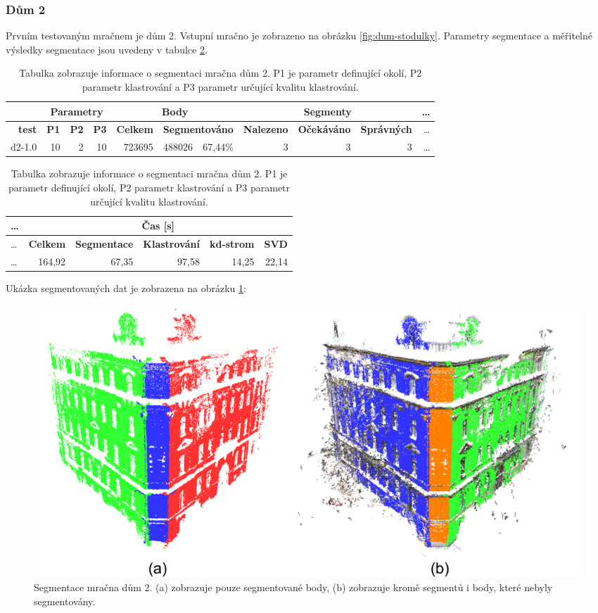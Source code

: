 \documentclass[11pt,twoside,a4paper]{book}
\begin{document}
\newpage
\subsubsection{Dům 2}
Prvním testovaným mračnem je dům 2. Vstupní mračno je zobrazeno na obrázku \ref{fig:dum-stodulky}. Parametry segmentace a měřitelné výsledky segmentace jsou uvedeny v tabulce \ref{table:test-d2}.

\begin{table}[ht]
\resizebox{\textwidth}{!} {
\begin{tabular}{|r|r|r|r|r|r|r|r|r|r|r|}
\hline
&\multicolumn{3}{c|}{\textbf{Parametry}} & \multicolumn{3}{c|}{\textbf{Body}} & \multicolumn{3}{c|}{\textbf{Segmenty}}&\ldots\\ \hline
\textbf{test} & \textbf{P1} & \textbf{P2} & \textbf{P3} & \textbf{Celkem} & \multicolumn{2}{c|}{\textbf{Segmentováno}} & \textbf{Nalezeno} & \textbf{Očekáváno} & \textbf{Správných} &\ldots\\ \hline
d2-1.0 & 10 & 2 & 10 & 723695 & 488026 & 67,44\% & 3 & 3 & 3 &\ldots\\ \hline
\end{tabular}
}
\begin{flushright} \scalebox{0.9} {
\begin{tabular}{|l|r|r|r|r|r|}
\hline
\ldots&\multicolumn{5}{|c|}{\textbf{Čas [s]}} \\ \hline
\ldots&\textbf{Celkem} & \textbf{Segmentace} & \textbf{Klastrování} & \textbf{kd-strom} & \textbf{SVD} \\\hline
\ldots&164,92 & 67,35 & 97,58 & 14,25 & 22,14 \\ \hline
\end{tabular}
}\end{flushright}

\caption{Tabulka zobrazuje informace o segmentaci mračna dům 2. P1 je parametr definující okolí, P2 parametr klastrování a P3 parametr určující kvalitu klastrování.} 
\label{table:test-d2}
\end{table}

Ukázka segmentovaných dat je zobrazena na obrázku \ref{fig:test-d2}:  

\begin{figure}[ht]
\begin{center}
\includegraphics[width=\textwidth]{figures/test-d2}
\caption{Segmentace mračna dům 2. (a) zobrazuje pouze segmentované body, (b) zobrazuje kromě segmentů i body, které nebyly segmentovány.}
\label{fig:test-d2}
\end{center}
\end{figure}
\end{document}
